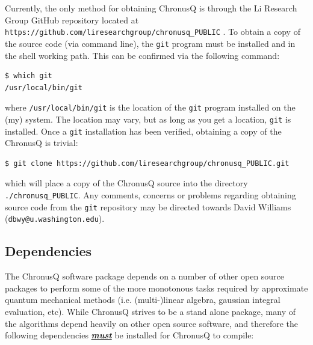\documentclass[12pt]{article}
\begin{document}
Currently, the only method for obtaining ChronusQ is through the Li Research Group GitHub repository located
at \texttt{https://github.com/liresearchgroup/chronusq\_PUBLIC} . To obtain a copy of the source code (via command line), the \texttt{git} program must be installed and in the shell working path. This can be confirmed via the following command:

\begin{lstlisting}
$ which git
/usr/local/bin/git
\end{lstlisting}
where \texttt{/usr/local/bin/git} is the location of the \texttt{git} program installed on the (my) system. The location may vary, but as long as you get a location, \texttt{git} is installed. Once a \texttt{git} installation has been verified, obtaining a copy of the ChronusQ is trivial:

\begin{lstlisting}
$ git clone https://github.com/liresearchgroup/chronusq_PUBLIC.git
\end{lstlisting}
which will place a copy of the ChronusQ source into the directory \texttt{./chronusq\_PUBLIC}. Any comments, concerns or problems regarding obtaining source code from the \texttt{git} repository may be directed towards David Williams (\texttt{dbwy@u.washington.edu}).

\subsection{Dependencies} \label{subsec:deps}

The ChronusQ software package depends on a number of other open source packages to perform some of the more monotonous tasks required by approximate quantum mechanical methods (i.e. (multi-)linear algebra, gaussian integral evaluation, etc). While ChronusQ strives to be a stand alone package, many of the algorithms depend heavily on other open source software, and therefore the following dependencies \textbf{\textit{\underline{must}}} be installed for ChronusQ to compile:
\end{document}
